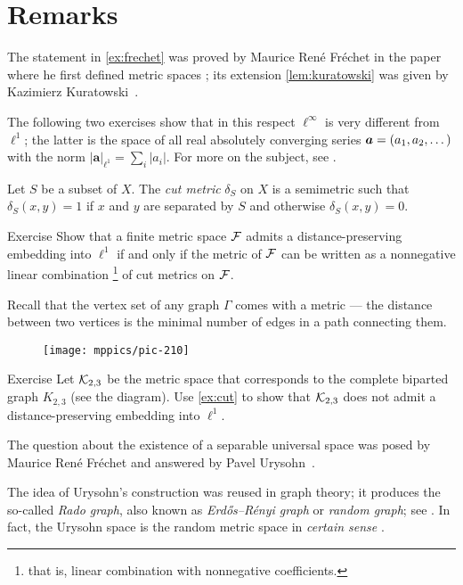 \section{Remarks}

The statement in \ref{ex:frechet} was proved by Maurice René Fréchet in the paper where he first defined metric spaces \cite{frechet};
its extension \ref{lem:kuratowski} was given by Kazimierz Kuratowski~\cite{kuratowski}.

The following two exercises show that in this respect $\ell^\infty$ is very different from $\ell^1$;
the latter is the space of all real absolutely converging series $\bm{a}\z=(a_1,a_2,\dots)$ with the norm $|\bm{a}|_{\ell^1}=\sum_i|a_i|$.
For more on the subject, see \cite{deza-laurent}.

Let $S$ be a subset of $X$.
The \emph{cut metric} $\delta_S$ on $X$ is a semimetric such that $\delta_S(x, y) = 1$ if $x$ and $y$ are separated
by $S$ and otherwise $\delta_S(x, y) = 0$.


\begin{thm}{Exercise}\label{ex:cut}
Show that a finite metric space $\mathcal{F}$ admits a distance-preserving embedding into $\ell^1$ if and only if the metric of $\mathcal{F}$ can be written as a nonnegative linear combination%
\footnote{that is, linear combination with nonnegative coefficients.} of cut metrics on $\mathcal{F}$.
\end{thm}

Recall that the vertex set of any graph $\Gamma$ comes with a metric ---
the distance between two vertices is the minimal number of edges in a path connecting them.

\begin{wrapfigure}{r}{15mm}
\vskip-4mm
\centering
\texttt{[image: mppics/pic-210]}
\end{wrapfigure}

\begin{thm}{Exercise}\label{ex:K23}
Let $\mathcal{K}_{2,3}$ be the metric space that corresponds to the complete biparted graph $K_{2,3}$ (see the diagram).
Use \ref{ex:cut} to show that $\mathcal{K}_{2,3}$ does not admit a distance-preserving embedding into $\ell^1$.
\end{thm}

The question about the existence of a separable universal space was posed by Maurice René Fréchet and answered by
Pavel Urysohn~\cite{urysohn}.

The idea of Urysohn's construction was reused in graph theory; it produces the so-called \emph{Rado graph},
also known as {}\emph{Erd\H{o}s--Rényi graph} or \emph{random graph}; see \cite{cameron}.
In fact, the Urysohn space is the random metric space in \textit{certain sense} \cite{vershik}.

